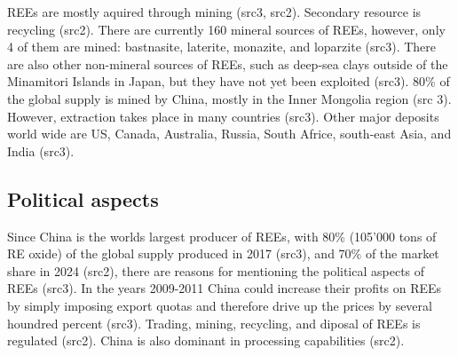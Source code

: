 REEs are mostly aquired through mining (src3, src2). Secondary resource is recycling (src2). There are currently 160 mineral sources of REEs, however, only 4 of them are mined: bastnasite, laterite, monazite, and loparzite (src3). There are also other non-mineral sources of REEs, such as deep-sea clays outside of the Minamitori Islands in Japan, but they have not yet been exploited (src3). 80\% of the global supply is mined by China, mostly in the Inner Mongolia region (src 3). However, extraction takes place in many countries (src3). Other major deposits world wide are US, Canada, Australia, Russia, South Africe, south-east Asia, and India (src3).

\subsection{Political aspects}

Since China is the worlds largest producer of REEs, with 80\% (105'000 tons of RE oxide) of the global supply produced in 2017 (src3), and 70\% of the market share in 2024 (src2), there are reasons for mentioning the political aspects of REEs (src3). In the years 2009-2011 China could increase their profits on REEs by simply imposing export quotas and therefore drive up the prices by several houndred percent (src3). Trading, mining, recycling, and diposal of REEs is regulated (src2). China is also dominant in processing capabilities (src2).